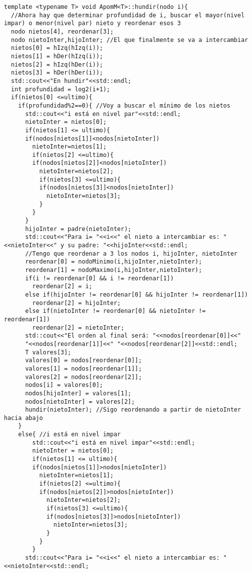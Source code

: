 \begin{verbatim}
template <typename T> void ApomM<T>::hundir(nodo i){
  //Ahora hay que determinar profundidad de i, buscar el mayor(nivel impar) o menor(nivel par) nieto y reordenar esos 3
  nodo nietos[4], reordenar[3];
  nodo nietoInter,hijoInter; //El que finalmente se va a intercambiar
  nietos[0] = hIzq(hIzq(i));
  nietos[1] = hDer(hIzq(i));
  nietos[2] = hIzq(hDer(i));
  nietos[3] = hDer(hDer(i));
  std::cout<<"En hundir"<<std::endl;
  int profundidad = log2(i+1);
  if(nietos[0] <=ultimo){
    if(profundidad%2==0){ //Voy a buscar el mínimo de los nietos
      std::cout<<"i está en nivel par"<<std::endl;
      nietoInter = nietos[0];
      if(nietos[1] <= ultimo){
      if(nodos[nietos[1]]<nodos[nietoInter])
        nietoInter=nietos[1];
        if(nietos[2] <=ultimo){
        if(nodos[nietos[2]]<nodos[nietoInter])
          nietoInter=nietos[2];
          if(nietos[3] <=ultimo){
          if(nodos[nietos[3]]<nodos[nietoInter])
            nietoInter=nietos[3];
          }
        }
      }
      hijoInter = padre(nietoInter);
      std::cout<<"Para i= "<<i<<" el nieto a intercambiar es: "<<nietoInter<<" y su padre: "<<hijoInter<<std::endl;
      //Tengo que reordenar a 3 los nodos i, hijoInter, nietoInter
      reordenar[0] = nodoMinimo(i,hijoInter,nietoInter);
      reordenar[1] = nodoMaximo(i,hijoInter,nietoInter);
      if(i != reordenar[0] && i != reordenar[1])
        reordenar[2] = i;
      else if(hijoInter != reordenar[0] && hijoInter != reordenar[1])
        reordenar[2] = hijoInter;
      else if(nietoInter != reordenar[0] && nietoInter != reordenar[1])
        reordenar[2] = nietoInter;
      std::cout<<"El orden al final será: "<<nodos[reordenar[0]]<<"
      "<<nodos[reordenar[1]]<<" "<<nodos[reordenar[2]]<<std::endl;
      T valores[3];
      valores[0] = nodos[reordenar[0]];
      valores[1] = nodos[reordenar[1]];
      valores[2] = nodos[reordenar[2]];
      nodos[i] = valores[0];
      nodos[hijoInter] = valores[1];
      nodos[nietoInter] = valores[2];
      hundir(nietoInter); //Sigo reordenando a partir de nietoInter hacia abajo
    }
    else{ //i está en nivel impar
        std::cout<<"i está en nivel impar"<<std::endl;
        nietoInter = nietos[0];
        if(nietos[1] <= ultimo){
        if(nodos[nietos[1]]>nodos[nietoInter])
          nietoInter=nietos[1];
          if(nietos[2] <=ultimo){
          if(nodos[nietos[2]]>nodos[nietoInter])
            nietoInter=nietos[2];
            if(nietos[3] <=ultimo){
            if(nodos[nietos[3]]>nodos[nietoInter])
              nietoInter=nietos[3];
            }
          }
        }
      std::cout<<"Para i= "<<i<<" el nieto a intercambiar es: "<<nietoInter<<std::endl;

\end{verbatim}
